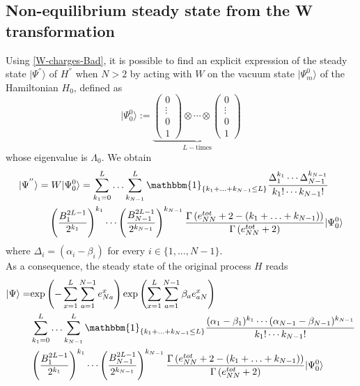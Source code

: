 \documentclass[10pt]{article}
\numberwithin{equation}{section}
\numberwithin{equation}{subsection}
\begin{document}
\subsection{Non-equilibrium steady state from the W transformation}\label{subsection-NONSS-W}
Using \eqref{W-charges-Bad}, it is possible to find an explicit expression of the steady state $|\Psi^{''}\rangle$ of $H^{''}$ when $N>2$ by acting with $W$ on the vacuum state $|\Psi_{m}^{0}\rangle$ of the Hamiltonian $H_{0}$, defined as
\begin{equation}\label{Vacuum-state}
	|\Psi_{0}^{0}\rangle:=\underbrace{\begin{pmatrix}
			0\\
			\vdots\\
			0\\
			1
		\end{pmatrix}\otimes \cdots \otimes\begin{pmatrix}
			0\\
			\vdots\\
			0\\
			1
	\end{pmatrix}}_{L-\text{times}}
\end{equation} whose eigenvalue is $\Lambda_{0}$. 
We obtain 
\begin{equation}\label{SteadyState-W-Good}
	\begin{split}
		|\Psi^{''}\rangle=&	\;W|\Psi_{0}^{0}\rangle =\sum_{k_{1}=0}^{L}\ldots\sum_{k_{N-1}}^{L}\mathbbm{1}_{\{k_{1}+\ldots+k_{N-1}\leq L\}}\frac{\Delta_{1}^{k_{1}}\cdots \Delta_{N-1}^{k_{N-1}}}{k_{1}!\cdots k_{N-1}!}\\&
		\left(\frac{B_{1}^{2L-1}}{2^{k_{1}}}\right)^{k_{1}}\cdots\left( \frac{B_{N-1}^{2L-1}}{2^{k_{N-1}}}\right)^{k_{N-1}}\frac{\Gamma\left(e_{NN}^{tot}+2-(k_{1}+\ldots+k_{N-1})\right)}{\Gamma\left(e_{NN}^{tot}+2\right)}|\Psi_{0}^{0}\rangle
	\end{split}
\end{equation}
where $\Delta_{i}=(\alpha_{i}-\beta_{i})$ for every $i\in\{1,\ldots,N-1\}$. \\
As a consequence, the steady state of the original process $H$ reads
\begin{align}
	|\Psi\rangle=&\text{exp}\left(-\sum_{x=1}^{L}\sum_{a=1}^{N-1}e_{Na}^{x}\right)\text{exp}\left(\sum_{x=1}^{L}\sum_{a=1}^{N-1}\beta_{a}e_{aN}^{x}\right)\nonumber\\&
	\sum_{k_{1}=0}^{L}\ldots\sum_{k_{N-1}}^{L}\mathbbm{1}_{\{k_{1}+\ldots+k_{N-1}\leq L\}}\frac{(\alpha_{1}-\beta_{1})^{k_{1}}\cdots (\alpha_{N-1}-\beta_{N-1})^{k_{N-1}}}{k_{1}!\cdots k_{N-1}!}\nonumber\\&
	\left(\frac{B_{1}^{2L-1}}{2^{k_{1}}}\right)^{k_{1}}\cdots\left( \frac{B_{N-1}^{2L-1}}{2^{k_{N-1}}}\right)^{k_{N-1}}\frac{\Gamma\left(e_{NN}^{tot}+2-(k_{1}+\ldots+k_{N-1})\right)}{\Gamma\left(e_{NN}^{tot}+2\right)}|\Psi_{0}^{0}\rangle
\end{align}
\end{document}
